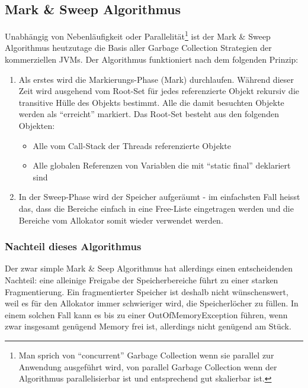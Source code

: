 \subsection{Mark \& Sweep Algorithmus\cite{langerkreft201005}}
Unabhängig von Nebenläufigkeit oder Parallelität\footnote{Man sprich von ``concurrent'' Garbage Collection wenn sie parallel zur Anwendung ausgeführt wird, von parallel Garbage Collection wenn der Algorithmus parallelisierbar ist und entsprechend gut skalierbar ist.} ist der Mark \& Sweep Algorithmus heutzutage die Basis aller Garbage Collection Strategien der kommerziellen JVMs. Der Algorithmus funktioniert nach dem folgenden Prinzip:
\begin{enumerate}
	\item Als erstes wird die Markierungs-Phase (Mark) durchlaufen. Während dieser Zeit wird ausgehend vom Root-Set für jedes referenzierte Objekt rekursiv die transitive Hülle des Objekts bestimmt. Alle die damit besuchten Objekte werden als ``erreicht'' markiert. Das Root-Set besteht aus den folgenden Objekten:
	\begin{itemize}
		\item Alle vom Call-Stack der Threads referenzierte Objekte
		\item Alle globalen Referenzen von Variablen die mit ``static final'' deklariert sind
	\end{itemize}
	\item In der Sweep-Phase wird der Speicher aufgeräumt - im einfachsten Fall heisst das, dass die Bereiche einfach in eine Free-Liste eingetragen werden und die Bereiche vom Allokator somit wieder verwendet werden.
\end{enumerate}

\subsubsection{Nachteil dieses Algorithmus}
Der zwar simple Mark \& Seep Algorithmus hat allerdings einen entscheidenden Nachteil: eine alleinige Freigabe der Speicherbereiche führt zu einer starken Fragmentierung. Ein fragmentierter Speicher ist deshalb nicht wünschenswert, weil es für den Allokator immer schwieriger wird, die Speicherlöcher zu füllen. In einem solchen Fall kann es bis zu einer OutOfMemoryException führen, wenn zwar insgesamt genügend Memory frei ist, allerdings nicht genügend am Stück.

